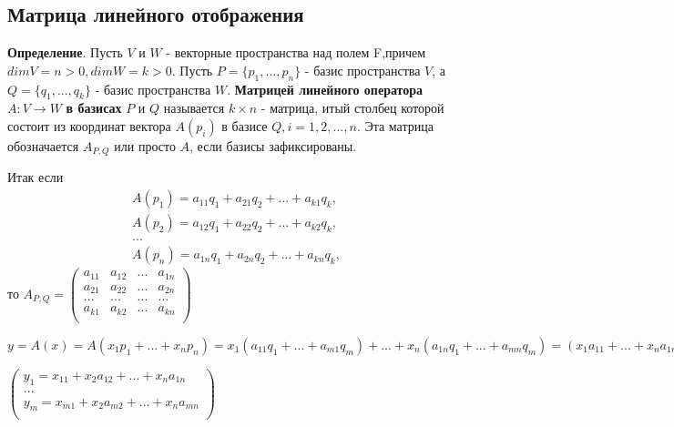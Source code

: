 \documentclass[a4paper]{article}
\begin{document}
\subsection*{Матрица линейного отображения}

\textbf{Определение}. Пусть $V$ и $W$ - векторные  пространства над полем F,\newline причем $dim V = n>0, dim W = k > 0$. Пусть $P = \{ p_1, ..., p_n \}$ - базис пространства $V$, а $Q = \{ q_1, ..., q_k \}$ - базис пространства $W$. \textbf{Матрицей линейного оператора } $A: V \rightarrow W$ \textbf{в базисах} $P$ и $Q$ называется $k \times n$ - матрица, итый столбец  которой состоит из координат вектора $A(p_i)$ в базисе $Q, i = 1, 2, ..., n$. Эта матрица обозначается $A_{P,Q}$ или просто $A$, если базисы зафиксированы.

Итак если \begin{equation}
\begin{matrix}
A(p_1) = a_{11}q_1 + a_{21}q_2 + ... + a_{k1}q_k,\\
A(p_2) = a_{12}q_1 + a_{22}q_2 + ... + a_{k2}q_k,\\
...\\
A(p_n) = a_{1n}q_1 + a_{2n}q_2 + ... + a_{kn}q_k,
\end{matrix}
\end{equation}
то $\displaystyle A_{P,Q} = \begin{pmatrix}
	a_{11}& a_{12}& ...& a_{1n}\\
	a_{21}& a_{22}& ...& a_{2n}\\
	...& ...& ...& ...\\
	a_{k1}& a_{k2}& ...& a_{kn}\\
\end{pmatrix}$

$y = A(x) = A(x_1p_1 + ... + x_np_n) = x_1(a_{11}q_1 + ... + a_{m1}q_m) + ... + x_n(a_{1n}q_1 + ... + a_{mn}q_m) = (x_1a_{11} + ... + x_na_{1n})q_1 + ... + (x_1a_{21} + ... + x_na_{2n}) + ...$

$\displaystyle \begin{pmatrix}
	y_1 = x_{11} + x_2a_{12} + ... + x_na_{1n}\\
	...\\
	y_m = x_{m1} + x_2a_{m2} + ... + x_na_{mn}\\
\end{pmatrix}$
\end{document}
